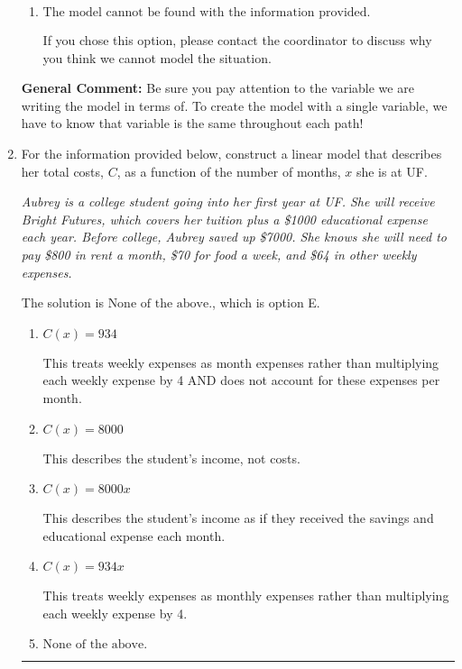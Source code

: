 \documentclass{extbook}[14pt]
\newcommand{\litem}[1]{\item #1

\rule{\textwidth}{0.4pt}}
\begin{document}
\begin{enumerate}
{\begin{enumerate}[label=\Alph*.]
* This is the correct option. Since the time spent on each path was equal, the distance of each path must be different. The model would be $0.167D_u + 0.100D_d + 0.125D_f$, where $D_u$ is distance traveling up the hill, $D_d$ is distance traveling down, and $D_f$ is distance traveling on a flat part.
\item \( \text{The model cannot be found with the information provided.} \)

If you chose this option, please contact the coordinator to discuss why you think we cannot model the situation.
\end{enumerate}

\textbf{General Comment:} Be sure you pay attention to the variable we are writing the model in terms of. To create the model with a single variable, we have to know that variable is the same throughout each path!
}
\litem{
For the information provided below, construct a linear model that describes her total costs, $C$, as a function of the number of months, $x$ she is at UF. 

\begin{center}
    \textit{ Aubrey is a college student going into her first year at UF. She will receive Bright Futures, which covers her tuition plus a \$1000 educational expense each year. Before college, Aubrey saved up \$7000. She knows she will need to pay \$800 in rent a month, \$70 for food a week, and \$64 in other weekly expenses. }
\end{center}
The solution is \( \text{None of the above.} \), which is option E.\begin{enumerate}[label=\Alph*.]
\item \( C(x) = 934 \)

This treats weekly expenses as month expenses rather than multiplying each weekly expense by 4 AND does not account for these expenses per month.
\item \( C(x) = 8000 \)

This describes the student's income, not costs.
\item \( C(x) = 8000 x \)

This describes the student's income as if they received the savings and educational expense each month.
\item \( C(x) = 934 x \)

This treats weekly expenses as monthly expenses rather than multiplying each weekly expense by 4.
\item \( \text{None of the above.} \)


\end{enumerate}}
\end{enumerate}
\end{document}
